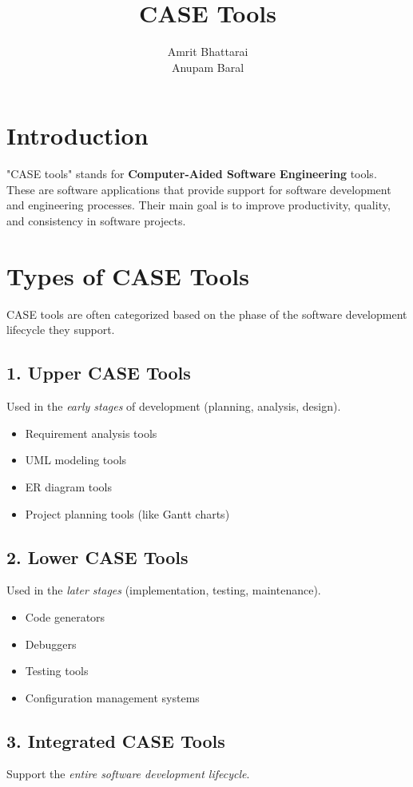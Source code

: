 \documentclass[aspectratio=1810]{beamer}
\title{CASE Tools}
\author{Amrit Bhattarai\\
Anupam Baral
}
\begin{document}
\maketitle

\section*{Introduction}
"CASE tools" stands for \textbf{Computer-Aided Software Engineering} tools. These are software applications that provide support for software development and engineering processes. Their main goal is to improve productivity, quality, and consistency in software projects.

\section*{Types of CASE Tools}
CASE tools are often categorized based on the phase of the software development lifecycle they support.

\subsection*{1. Upper CASE Tools}
Used in the \textit{early stages} of development (planning, analysis, design).

\begin{itemize}
    \item Requirement analysis tools
    \item UML modeling tools
    \item ER diagram tools
    \item Project planning tools (like Gantt charts)
\end{itemize}

\subsection*{2. Lower CASE Tools}
Used in the \textit{later stages} (implementation, testing, maintenance).

\begin{itemize}
    \item Code generators
    \item Debuggers
    \item Testing tools
    \item Configuration management systems
\end{itemize}

\subsection*{3. Integrated CASE Tools}
Support the \textit{entire software development lifecycle}.
\end{document}

